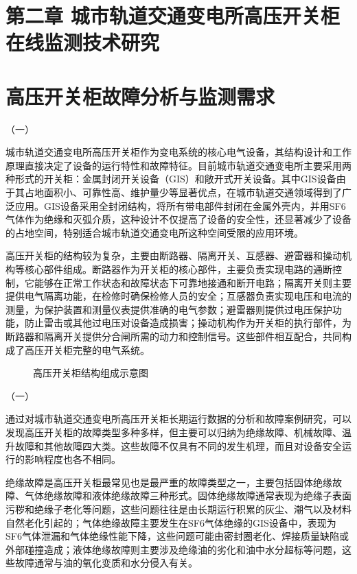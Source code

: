 \section{第二章 城市轨道交通变电所高压开关柜在线监测技术研究}

\section{高压开关柜故障分析与监测需求}

（一）

城市轨道交通变电所高压开关柜作为变电系统的核心电气设备，其结构设计和工作原理直接决定了设备的运行特性和故障特征。目前城市轨道交通变电所主要采用两种形式的开关柜：金属封闭开关设备（GIS）和敞开式开关设备。其中GIS设备由于其占地面积小、可靠性高、维护量少等显著优点，在城市轨道交通领域得到了广泛应用。GIS设备采用全封闭结构，将所有带电部件封闭在金属外壳内，并用SF6气体作为绝缘和灭弧介质，这种设计不仅提高了设备的安全性，还显著减少了设备的占地空间，特别适合城市轨道交通变电所这种空间受限的应用环境。

高压开关柜的结构较为复杂，主要由断路器、隔离开关、互感器、避雷器和操动机构等核心部件组成。断路器作为开关柜的核心部件，主要负责实现电路的通断控制，它能够在正常工作状态和故障状态下可靠地接通和断开电路；隔离开关则主要提供电气隔离功能，在检修时确保检修人员的安全；互感器负责实现电压和电流的测量，为保护装置和测量仪表提供准确的电气参数；避雷器则提供过电压保护功能，防止雷击或其他过电压对设备造成损害；操动机构作为开关柜的执行部件，为断路器和隔离开关提供分合闸所需的动力和控制信号。这些部件相互配合，共同构成了高压开关柜完整的电气系统。

\begin{figure}[h]
\centering
\caption{高压开关柜结构组成示意图}
\label{fig:switchgear_structure}
\end{figure}

（一）

通过对城市轨道交通变电所高压开关柜长期运行数据的分析和故障案例研究，可以发现高压开关柜的故障类型多种多样，但主要可以归纳为绝缘故障、机械故障、温升故障和其他故障四大类。这些故障不仅具有不同的发生机理，而且对设备安全运行的影响程度也各不相同。

绝缘故障是高压开关柜最常见也是最严重的故障类型之一，主要包括固体绝缘故障、气体绝缘故障和液体绝缘故障三种形式。固体绝缘故障通常表现为绝缘子表面污秽和绝缘子老化等问题，这些问题往往是由长期运行积累的灰尘、潮气以及材料自然老化引起的；气体绝缘故障主要发生在SF6气体绝缘的GIS设备中，表现为SF6气体泄漏和气体绝缘性能下降，这些问题可能由密封圈老化、焊接质量缺陷或外部碰撞造成；液体绝缘故障则主要涉及绝缘油的劣化和油中水分超标等问题，这些故障通常与油的氧化变质和水分侵入有关。

